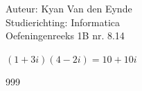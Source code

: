 \documentclass[a4paper]{article}
\begin{document}
  
\noindent \large Auteur: Kyan Van den Eynde \\
\noindent \large Studierichting: Informatica\\
\noindent \large Oefeningenreeks 1B nr. 8.14\\

\medskip

\normalsize

$(1+3i)(4-2i) = 10 + 10i$\\

\begin{thebibliography}{999}
\end{thebibliography}
\end{document}

